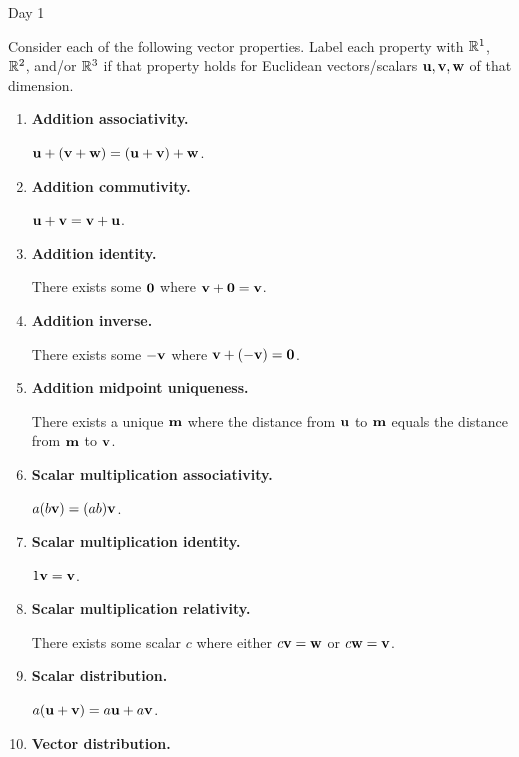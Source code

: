
\begin{applicationActivities}{Day 1}


\begin{activity}{25}
Consider each of the following vector properties. Label each property
with \(\mathbb{R}^1\), \(\mathbb{R}^2\), and/or \(\mathbb{R}^3\) if that property holds for
Euclidean vectors/scalars \(\mathbf u,\mathbf v,\mathbf w\) of that dimension.
\begin{multicols}{2}
\begin{enumerate}
  \item \textbf{Addition associativity.}

        \(\mathbf u+(\mathbf v+\mathbf w)=
        (\mathbf u+\mathbf v)+\mathbf w\).
  \item \textbf{Addition commutivity.}

        \(\mathbf u+\mathbf v=
        \mathbf v+\mathbf u\).
  \item \textbf{Addition identity.}

        There exists some \(\mathbf 0\)
        where \(\mathbf v+\mathbf 0=\mathbf v\).
  \item \textbf{Addition inverse.}

        There exists some \(-\mathbf v\)
        where \(\mathbf v+(-\mathbf v)=\mathbf 0\).
  \item \textbf{Addition midpoint uniqueness.}

        There exists a unique \(\mathbf m\) where the distance from
        \(\mathbf u\) to \(\mathbf m\) equals the distance from \(\mathbf m\)
        to \(\mathbf v\).
  \item \textbf{Scalar multiplication associativity.}

        \(a(b\mathbf v)=(ab)\mathbf v\).
  \item \textbf{Scalar multiplication identity.}

        \(1\mathbf v=\mathbf v\).
  \item \textbf{Scalar multiplication relativity.}

        There exists some scalar \(c\) where either \(c\mathbf v=\mathbf w\)
        or \(c\mathbf w=\mathbf v\).
  \item \textbf{Scalar distribution.}

        \(a(\mathbf u+\mathbf v)=a\mathbf u+a\mathbf v\).
  \item \textbf{Vector distribution.}


\end{enumerate}
\end{multicols}
\end{activity}
\end{applicationActivities}
